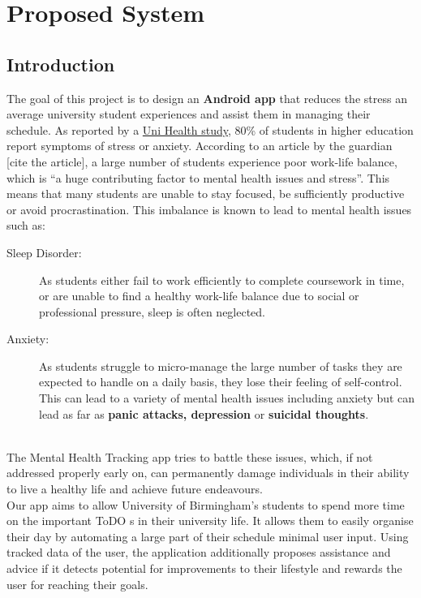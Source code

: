 \documentclass[a4paper,11pt]{article} %
\begin{document}
\newpage

\tableofcontents
\newpage

\section{Proposed System}
\subsection{Introduction}
The goal of this project is to design an \textbf{Android app} that reduces the stress an average university
 student experiences and assist them in managing their schedule. 
As reported by a \href{https://www.theguardian.com/education/2019/may/31/why-are-students-at-university-so-stressed}{Uni Health study}, 80\% of students in higher 
education report symptoms of stress or anxiety.
According to an article by the guardian [cite the article], a large number of students 
experience poor work-life balance, which is ``a huge contributing factor to mental health issues and stress''.
This means that many students are unable to stay focused, be sufficiently productive 
or avoid procrastination. This imbalance is known to lead to mental health issues such as:
\begin{description}
    \item[Sleep Disorder:] As students either fail to work efficiently to complete coursework 
    in time, or are unable to find a healthy work-life balance due to social or professional 
    pressure, sleep is often neglected.
    \item[Anxiety:] As students struggle to micro-manage the large number of tasks they are 
    expected to handle on a daily basis, they lose their feeling of self-control. This can 
    lead to a variety of mental health issues including anxiety but can lead as far 
    as \textbf{panic attacks, depression} or \textbf{suicidal thoughts}.
\end{description}
\ \\
The Mental Health Tracking app tries to battle these issues, which, if not addressed properly early on, 
can permanently damage individuals in their ability to live a healthy life and achieve future endeavours.\\

Our app aims to allow University of Birmingham’s students to spend more time on the important ToDO s in 
their university life. It allows them to easily organise their day by automating a large part of their 
schedule minimal user input.  
Using tracked data of the user, the application additionally proposes assistance and advice if it 
detects potential for improvements to their lifestyle and rewards the user for reaching their goals. 
\end{document}

